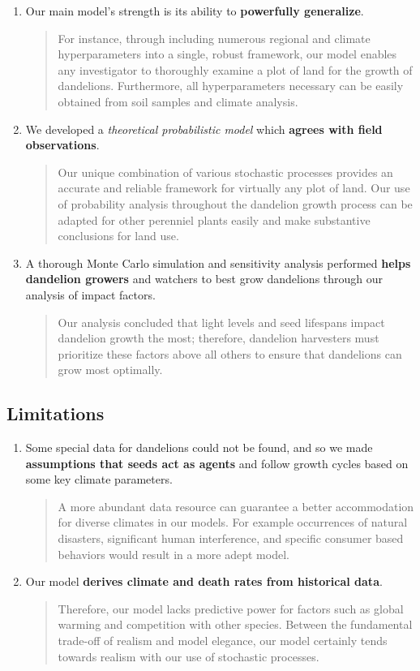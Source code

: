 \begin{enumerate}
 \item Our main model’s strength is its ability to \textbf{powerfully generalize}.
    \begin{quote}
        For instance, through including numerous regional and climate hyperparameters into a single, robust framework, our model enables any investigator to thoroughly examine a plot of land for the growth of dandelions. Furthermore, all hyperparameters necessary can be easily obtained from soil samples and climate analysis.
    \end{quote}
    
\item We developed a \textit{theoretical probabilistic model} which \textbf{agrees with field observations}.
\begin{quote}
    Our unique combination of various stochastic processes provides an accurate and reliable framework for virtually any plot of land. Our use of probability analysis throughout the dandelion growth process can be adapted for other perenniel plants easily and make substantive conclusions for land use.
\end{quote}

\item A thorough Monte Carlo simulation and sensitivity analysis performed \textbf{helps dandelion growers} and watchers to best grow dandelions through our analysis of impact factors.
\begin{quote}
    Our analysis concluded that light levels and seed lifespans impact dandelion growth the most; therefore, dandelion harvesters must prioritize these factors above all others to ensure that dandelions can grow most optimally.
\end{quote}
\end{enumerate}

\subsection{Limitations}
\begin{enumerate}
\item Some special data for dandelions could not be found, and so we made \textbf{assumptions that seeds act as agents} and follow growth cycles based on some key climate parameters. 
\begin{quote}
    A more abundant data resource can guarantee a better accommodation for diverse climates in our models. For example occurrences of natural disasters, significant human interference, and specific consumer based behaviors would result in a more adept model. 
\end{quote}

\item Our model \textbf{derives climate and death rates from historical data}.
\begin{quote}
    Therefore, our model lacks predictive power for factors such as global warming and competition with other species. Between the fundamental trade-off of realism and model elegance, our model certainly tends towards realism with our use of stochastic processes.
\end{quote}
\end{enumerate}

